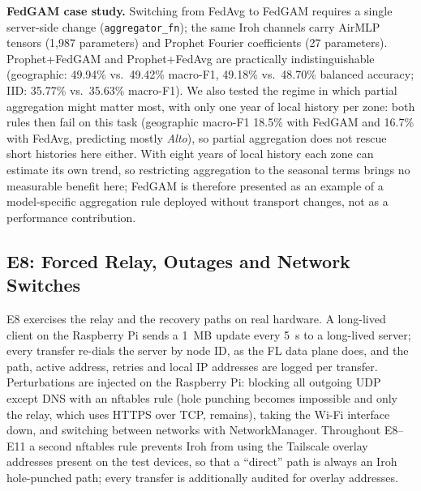 \documentclass[a4paper,fleqn]{cas-dc}
\begin{document}
\textbf{FedGAM case study.} Switching from FedAvg to FedGAM requires a single server-side change (\texttt{aggregator\_fn}); the same Iroh channels carry AirMLP tensors (1{,}987 parameters) and Prophet Fourier coefficients (27 parameters). Prophet+FedGAM and Prophet+FedAvg are practically indistinguishable (geographic: 49.94\% vs.\ 49.42\% macro-F1, 49.18\% vs.\ 48.70\% balanced accuracy; IID: 35.77\% vs.\ 35.63\% macro-F1). We also tested the regime in which partial aggregation might matter most, with only one year of local history per zone: both rules then fail on this task (geographic macro-F1 18.5\% with FedGAM and 16.7\% with FedAvg, predicting mostly \textit{Alto}), so partial aggregation does not rescue short histories here either. With eight years of local history each zone can estimate its own trend, so restricting aggregation to the seasonal terms brings no measurable benefit here; FedGAM is therefore presented as an example of a model-specific aggregation rule deployed without transport changes, not as a performance contribution.

\subsection{E8: Forced Relay, Outages and Network Switches}
\label{sec:e8}

E8 exercises the relay and the recovery paths on real hardware. A long-lived client on the Raspberry Pi sends a 1~MB update every 5~s to a long-lived server; every transfer re-dials the server by node ID, as the FL data plane does, and the path, active address, retries and local IP addresses are logged per transfer. Perturbations are injected on the Raspberry Pi: blocking all outgoing UDP except DNS with an nftables rule (hole punching becomes impossible and only the relay, which uses HTTPS over TCP, remains), taking the Wi-Fi interface down, and switching between networks with NetworkManager. Throughout E8--E11 a second nftables rule prevents Iroh from using the Tailscale overlay addresses present on the test devices, so that a ``direct'' path is always an Iroh hole-punched path; every transfer is additionally audited for overlay addresses.
\end{document}
